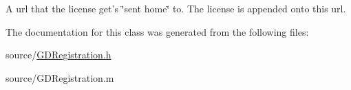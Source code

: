 A url that the license get's \char`\"{}sent home\char`\"{} to. The license is appended onto this url. 

The documentation for this class was generated from the following files:\begin{DoxyCompactItemize}
\item 
source/\hyperlink{_g_d_registration_8h}{GDRegistration.h}\item 
source/GDRegistration.m\end{DoxyCompactItemize}
